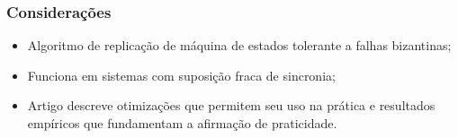 \documentclass{beamer}
\begin{document}
\begin{frame}
  \frametitle{Considerações}
  
  \begin{itemize}
    \item
      Algoritmo de replicação de máquina de estados tolerante a falhas bizantinas;

    \item
      Funciona em sistemas com suposição fraca de sincronia;

    \item
      Artigo descreve otimizações que permitem seu uso na prática e resultados empíricos que fundamentam a afirmação de praticidade.
  \end{itemize}
\end{frame}
\end{document}
